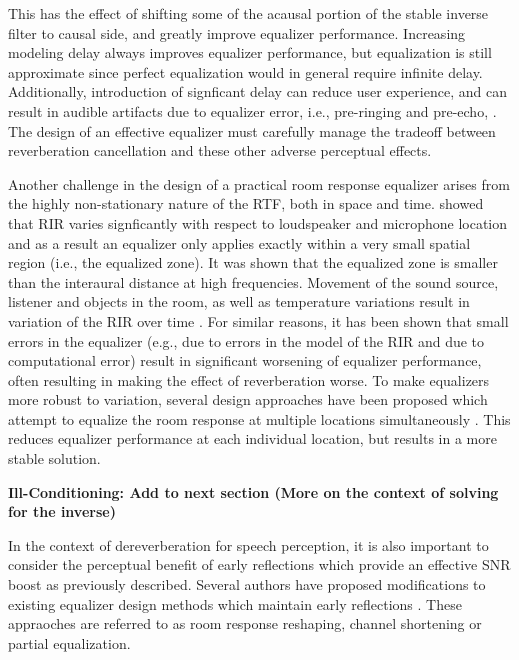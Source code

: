 This has the effect of shifting some of the acausal portion of the stable inverse filter to causal side, and greatly improve equalizer performance. Increasing modeling delay always improves equalizer performance, but equalization is still approximate since perfect equalization would in general require infinite delay. Additionally, introduction of signficant delay can reduce user experience, and can result in audible artifacts due to equalizer error, i.e., pre-ringing and pre-echo, \citep{brannmark2009spatially}. The design of an effective equalizer must carefully manage the tradeoff between reverberation cancellation and these other adverse perceptual effects.

Another challenge in the design of a practical room response equalizer arises from the highly non-stationary nature of the RTF, both in space and time. \cite{mourjopoulos1985variation} showed that RIR varies signficantly with respect to loudspeaker and microphone location and as a result an equalizer only applies exactly within a very small spatial region (i.e., the equalized zone). It was shown that the equalized zone is smaller than the interaural distance at high frequencies. Movement of the sound source, listener and objects in the room, as well as temperature variations result in variation of the RIR over time \citep{omura1999compensating}. For similar reasons, it has been shown that small errors in the equalizer (e.g., due to errors in the model of the RIR and due to computational error) result in significant worsening of equalizer performance, often resulting in making the effect of reverberation worse. To make equalizers more robust to variation, several design approaches have been proposed which attempt to equalize the room response at multiple locations simultaneously \citep{elliott1989multiple, haneda1997multiple}. This reduces equalizer performance at each individual location, but results in a more stable solution.

\textbf{Ill-Conditioning: Add to next section (More on the context of solving for the inverse)}

In the context of dereverberation for speech perception, it is also important to consider the perceptual benefit of early reflections which provide an effective SNR boost as previously described. Several authors have proposed modifications to existing equalizer design methods which maintain early reflections \citep{karjalainen2006equalization, maamar2006partial, mei2009room}. These appraoches are referred to as room response reshaping, channel shortening or partial equalization.

